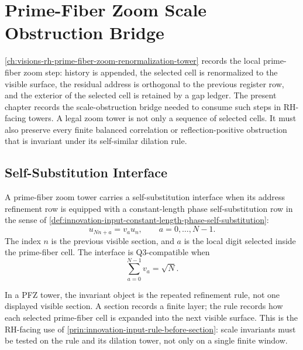 \chapter{Prime-Fiber Zoom Scale Obstruction Bridge}
\label{ch:visions-rh-prime-fiber-zoom-scale-obstruction-bridge}

\autoref{ch:visions-rh-prime-fiber-zoom-renormalization-tower} records the
local prime-fiber zoom step: history is appended, the selected cell is
renormalized to the visible surface, the residual address is orthogonal to
the previous register row, and the exterior of the selected cell is retained
by a gap ledger.  The present chapter records the scale-obstruction bridge
needed to consume such steps in RH-facing towers.  A legal zoom tower is not
only a sequence of selected cells.  It must also preserve every finite
balanced correlation or reflection-positive obstruction that is invariant
under its self-similar dilation rule.

\section{Self-Substitution Interface}
\label{sec:rh-pfz-self-substitution-interface}

\begin{definition}
\label{def:rh-pfz-self-substitution-interface}
A prime-fiber zoom tower carries a self-substitution interface when its
address refinement row is equipped with a constant-length phase
self-substitution row in the sense of
\autoref{def:innovation-input-constant-length-phase-self-substitution}:
$$
u_{Nn+a}=v_a u_n,
\qquad
a=0,\ldots,N-1.
$$
The index $n$ is the previous visible section, and $a$ is the local digit
selected inside the prime-fiber cell.  The interface is Q3-compatible
when
$$
\sum_{a=0}^{N-1}v_a=\sqrt N.
$$
\end{definition}

\begin{principle}
\label{prin:rh-pfz-rule-before-visible-section}
In a PFZ tower, the invariant object is the repeated refinement rule, not
one displayed visible section.  A section records a finite layer; the rule
records how each selected prime-fiber cell is expanded into the next
visible surface.  This is the RH-facing use of
\autoref{prin:innovation-input-rule-before-section}: scale invariants must
be tested on the rule and its dilation tower, not only on a single finite
window.
\end{principle}

